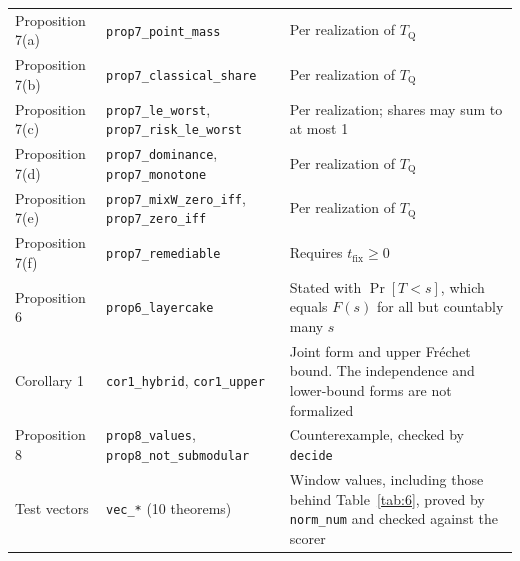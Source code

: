 \documentclass[conference]{IEEEtran}
\newcommand{\Tq}{T_{\mathrm{Q}}}
\newcommand{\tfix}{t_{\mathrm{fix}}}
\providecommand{\lt}{}\renewcommand{\lt}{<}
\begin{document}
\begin{table}[!t]
\begin{tabularx}{\linewidth}{>{\raggedright\arraybackslash}X>{\raggedright\arraybackslash}X>{\raggedright\arraybackslash}X}
Proposition 7(a) & \texttt{prop7\_\allowbreak{}point\_\allowbreak{}mass} & Per realization of $\Tq$ \\
Proposition 7(b) & \texttt{prop7\_\allowbreak{}classical\_\allowbreak{}share} & Per realization of $\Tq$ \\
Proposition 7(c) & \texttt{prop7\_\allowbreak{}le\_\allowbreak{}worst}, \texttt{prop7\_\allowbreak{}risk\_\allowbreak{}le\_\allowbreak{}worst} & Per realization; shares may sum to at most 1 \\
Proposition 7(d) & \texttt{prop7\_\allowbreak{}dominance}, \texttt{prop7\_\allowbreak{}monotone} & Per realization of $\Tq$ \\
Proposition 7(e) & \texttt{prop7\_\allowbreak{}mixW\_\allowbreak{}zero\_\allowbreak{}iff}, \texttt{prop7\_\allowbreak{}zero\_\allowbreak{}iff} & Per realization of $\Tq$ \\
Proposition 7(f) & \texttt{prop7\_\allowbreak{}remediable} & Requires $\tfix \ge 0$ \\
Proposition 6 & \texttt{prop6\_\allowbreak{}layercake} & Stated with $\Pr[T \lt s]$, which equals $F(s)$ for all but countably many $s$ \\
Corollary 1 & \texttt{cor1\_\allowbreak{}hybrid}, \texttt{cor1\_\allowbreak{}upper} & Joint form and upper Fréchet bound. The independence and lower-bound forms are not formalized \\
Proposition 8 & \texttt{prop8\_\allowbreak{}values}, \texttt{prop8\_\allowbreak{}not\_\allowbreak{}submodular} & Counterexample, checked by \texttt{decide} \\
Test vectors & \texttt{vec\_\allowbreak{}*} (10 theorems) & Window values, including those behind Table~\ref{tab:6}, proved by \texttt{norm\_\allowbreak{}num} and checked against the scorer \\
\bottomrule
\end{tabularx}
\end{table}
\end{document}

